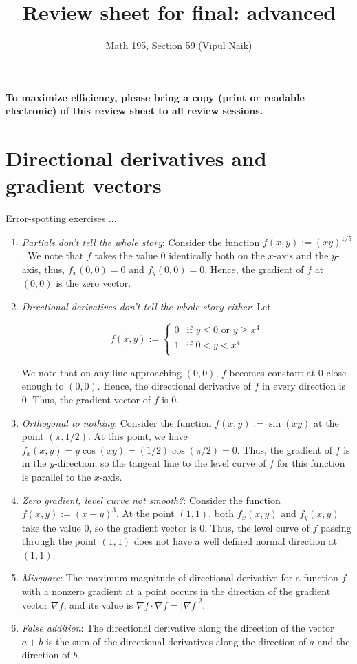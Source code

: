 \documentclass[10pt]{amsart}
\title{Review sheet for final: advanced}
\author{Math 195, Section 59 (Vipul Naik)}
\begin{document}
\maketitle

{\bf To maximize efficiency, please bring a copy (print or readable
electronic) of this review sheet to all review sessions.}

\section{Directional derivatives and gradient vectors}


Error-spotting exercises ...

\begin{enumerate}
\item {\em Partials don't tell the whole story}: Consider the function
  $f(x,y) := (xy)^{1/5}$. We note that $f$ takes the value $0$
  identically both on the $x$-axis and the $y$-axis, thus, $f_x(0,0) =
  0$ and $f_y(0,0) = 0$. Hence, the gradient of $f$ at $(0,0)$ is the
  zero vector.
\item {\em Directional derivatives don't tell the whole story either}: Let

  $$f(x,y) := \left \lbrace\begin{array}{rl} 0 & \text{if } y \le 0 \text{ or } y \ge x^4 \\ 1 & \text{if } 0 < y < x^4 \\\end{array}\right.$$

  We note that on any line approaching $(0,0)$, $f$ becomes constant
  at $0$ close enough to $(0,0)$. Hence, the directional derivative of
  $f$ in every direction is $0$. Thus, the gradient vector of $f$ is $0$.
\item {\em Orthogonal to nothing}: Consider the function $f(x,y) :=
  \sin(xy)$ at the point $(\pi,1/2)$. At this point, we have $f_x(x,y)
  = y\cos(xy) = (1/2)\cos(\pi/2) = 0$. Thus, the gradient of $f$ is in
  the $y$-direction, so the tangent line to the level curve of $f$ for
  this function is parallel to the $x$-axis.
\item {\em Zero gradient, level curve not smooth?}: Consider the
  function $f(x,y) := (x - y)^3$. At the point $(1,1)$, both
  $f_x(x,y)$ and $f_y(x,y)$ take the value $0$, so the gradient vector
  is $0$. Thus, the level curve of $f$ passing through the point
  $(1,1)$ does not have a well defined normal direction at $(1,1)$.
\item {\em Misquare}: The maximum magnitude of directional derivative
  for a function $f$ with a nonzero gradient at a point occurs in the
  direction of the gradient vector $\nabla f$, and its value is
  $\nabla f \cdot \nabla f = |\nabla f|^2$.
\item {\em False addition}: The directional derivative along the
  direction of the vector $a + b$ is the sum of the directional
  derivatives along the direction of $a$ and the direction of $b$.
\end{enumerate}
\end{document}
